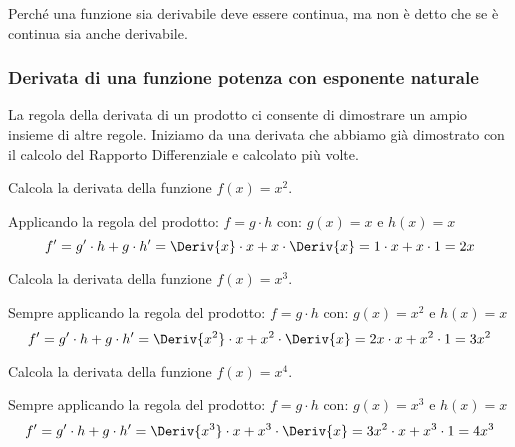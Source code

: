 Perché una funzione sia derivabile deve essere continua, ma non è detto 
che se è continua sia anche derivabile.

\subsubsection{Derivata di una funzione potenza con esponente naturale}
\label{subsubsec:derivata_f_potenza_N}
La regola della derivata di un prodotto ci consente di dimostrare un 
ampio insieme di altre regole. 
Iniziamo da una derivata che abbiamo già dimostrato con il calcolo del 
Rapporto Differenziale e calcolato più volte.

\begin{esempio}
\label{esem:diff_quadrato}
Calcola la derivata della funzione \(f(x)=x^2\).

Applicando la regola del prodotto:
\(f = g \cdot h\) \quad con: \quad \(g(x) = x\) \quad e \quad \(h(x) = x\)
\[f' = g' \cdot h + g \cdot h' = 
\Deriv{x} \cdot x + x \cdot \Deriv{x} =
1 \cdot x + x \cdot 1 = 2x\]
\end{esempio}

\begin{esempio}
\label{esem:diff_quadrato}
Calcola la derivata della funzione \(f(x)=x^3\).

Sempre applicando la regola del prodotto:
\(f = g \cdot h\) \quad con: \quad \(g(x) = x^2\) \quad e \quad \(h(x) = x\)
\[f' = g' \cdot h + g \cdot h' = 
\Deriv{x^2} \cdot x + x^2 \cdot \Deriv{x} =
2x \cdot x + x^2 \cdot 1 = 3x^2\]
\end{esempio}

\begin{esempio}
\label{esem:diff_quadrato}
Calcola la derivata della funzione \(f(x)=x^4\).

Sempre applicando la regola del prodotto:
\(f = g \cdot h\) \quad con: \quad \(g(x) = x^3\) \quad e \quad \(h(x) = x\)
\[f' = g' \cdot h + g \cdot h' = 
\Deriv{x^3} \cdot x + x^3 \cdot \Deriv{x} =
3x^2 \cdot x + x^3 \cdot 1 = 4x^3\]
\end{esempio}



